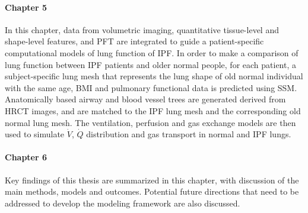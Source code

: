 \paragraph{Chapter 5} In this chapter, data from volumetric imaging, quantitative tissue-level and shape-level features, and PFT are integrated to guide a patient-specific computational models of lung function of IPF. In order to make a comparison of lung function between IPF patients and older normal people, for each patient, a subject-specific lung mesh that represents the lung shape of old normal individual with the same age, BMI and pulmonary functional data is predicted using SSM. Anatomically based airway and blood vessel trees are generated derived from HRCT images, and are matched to the IPF lung mesh and the corresponding old normal lung mesh. The ventilation, perfusion and gas exchange models are then used to simulate $\dot{V}$, $\dot{Q}$ distribution and gas transport in normal and IPF lungs.
\paragraph{Chapter 6} Key findings of this thesis are summarized in this chapter, with discussion of the main methods, models and outcomes. Potential future directions that need to be addressed to develop the modeling framework are also discussed. 
